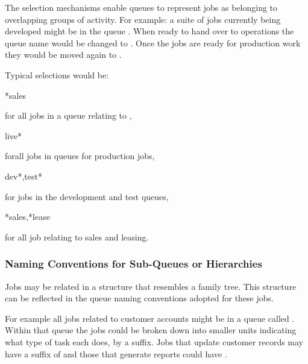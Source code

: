 The selection mechanisms enable queues to represent jobs as belonging to overlapping groups of activity. For example: a suite of jobs currently
being developed might be in the queue . When ready to hand over to operations the queue name would be changed to
. Once the jobs are ready for production work they would be moved again to
.

Typical selections would be:

\begin{expara}

*sales

\end{expara}

for all jobs in a queue relating to ,

\begin{expara}

live*

\end{expara}

forall jobs in queues for production jobs,

\begin{expara}

dev*,test*

\end{expara}

for jobs in the development and test queues,

\begin{expara}

*sales,*lease

\end{expara}

for all job relating to sales and leasing.

\subsubsection{Naming Conventions for Sub-Queues or Hierarchies}
Jobs may be related in a structure that resembles a family tree. This structure can be reflected in the queue naming conventions adopted for
these jobs.

For example all jobs related to customer accounts might be in a queue called . Within that queue the jobs could be
broken down into smaller units indicating what type of task each does, by a suffix. Jobs that update customer records may have a suffix of
 and those that generate reports could have .

